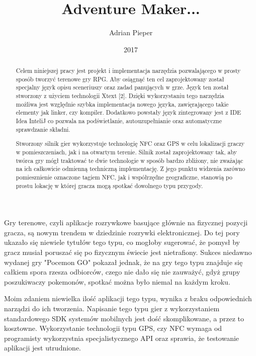 \documentclass	{xmgr}
\author   {Adrian Pieper}
\title    {Adventure Maker...}
\date     {2017}
\begin{document}
\begin{abstract}
  Celem niniejszej pracy jest projekt i implementacja narzędzia pozwalającego w prosty sposób tworzyć terenowe gry RPG. Aby osiągnąć ten cel zaprojektowany został specjalny język opisu sceneriuszy oraz zadad panujących w grze. Język ten został stworzony z użyciem technologii Xtext [2]. Dzięki wykorzystaniu tego narzędzia możliwa jest względnie szybka implementacja nowego języka, zawięrającego takie elementy jak linker, czy kompiler. Dodatkowo powstały język zintegrowany jest z IDE Idea InteliJ co pozwala na podświetlanie, autouzupełnianie oraz automatyczne sprawdzanie składni.
  
  Stworzony silnik gier wykorzystuje technologię NFC oraz GPS w celu lokalizacji graczy w pomieszczeniach, jak i na otwartym terenie. Silnik został zaprojektowany tak, aby twórca gry mógł traktować te dwie technologie w sposób bardzo zbliżony, nie zważając na ich  całkowicie odmienną techniczną implementację. Z jego punktu widzenia zarówno pomiesznienie oznaczone tagiem NFC, jak i współrzędne geograficzne, stanowią po prostu lokację w której gracza mogą spotkać dowolnego typu przygody. 
\end{abstract}


\maketitle

\introduction

Gry terenowe, czyli aplikacje rozrywkowe basujące głównie na fizycznej pozycji gracza, są nowym trendem w dziedzinie rozrywki elektronicznej. Do tej pory ukazało się niewiele tytułów tego typu, co mogłoby sugerować, że pomysł by gracz musiał poruszać się po fizycznym świecie jest nietrafiony. Sukces niedawno wydanej gry "Pocemon GO" pokazał jednak, że na gry tego typu znajduje się całkiem spora rzesza odbiorców, czego nie dało się nie zauważyć, gdyż grupy poszukiwaczy pokemonów, spotkać można było niemal na każdym kroku.

Moim zdaniem niewielka ilość aplikacji tego typu, wynika z braku odpowiednich narządzi do ich tworzenia. Napisanie tego typu gier z wykorzystaniem standardowego SDK systemów mobilnych jest dość skomplikowane, a przez to kosztowne. Wykorzystanie technologii typu GPS, czy NFC wymaga od programisty wykorzystnia specjalistycznego API oraz sprawia, że testowanie aplikacji jest utrudnione.
\end{document}
